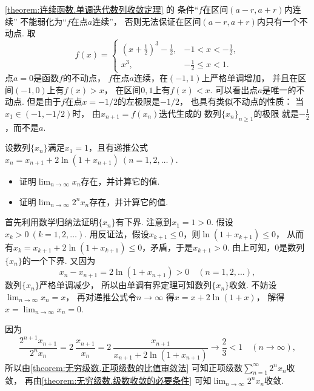 \begin{remark}
\cref{theorem:连续函数.单调迭代数列收敛定理} 的
条件“\(f\)在区间\((a-r,a+r)\)内连续”
不能弱化为“\(f\)在点\(a\)连续”，
否则无法保证在区间\((a-r,a+r)\)内只有一个不动点.
取\[
	f(x) = \left\{ \begin{array}{cc}
		\left( x + \frac12 \right)^3 - \frac12, & -1 < x < -\frac12, \\
		x^3, & -\frac12 \leq x < 1.
	\end{array} \right.
\]
点\(a=0\)是函数\(f\)的不动点，
\(f\)在点\(a\)连续，在\((-1,1)\)上严格单调增加，
并且在区间\((-1,0)\)上有\(f(x)>x\)，
在区间\(0,1\)上有\(f(x)<x\).
可以看出点\(a\)是唯一的不动点.
但是由于\(f\)在点\(x=-1/2\)的左极限是\(-1/2\)，
也具有类似不动点的性质：
当\(x_1 \in (-1,-1/2)\)时，
由\(x_{n+1} = f(x_n)\)迭代生成的
数列\(\{x_n\}_{n\geq1}\)的极限
就是\(-\frac12\)，而不是\(a\).
\end{remark}

\begin{example}
设数列\(\{x_n\}\)满足\(x_1=1\)，且有递推公式\(x_n=x_{n+1}+2\ln(1+x_{n+1})\ (n=1,2,\dotsc)\).
\begin{itemize}
	\item 证明\(\lim_{n\to\infty} x_n\)存在，并计算它的值.
	\item 证明\(\lim_{n\to\infty} 2^n x_n\)存在，并计算它的值.
\end{itemize}
\begin{solution}
首先利用数学归纳法证明\(\{x_n\}\)有下界.
注意到\(x_1=1>0\).
假设\(x_k>0\ (k=1,2,\dotsc)\).
用反证法，假设\(x_{k+1}\leq0\)，则\(\ln(1+x_{k+1})\leq0\)，
从而有\(x_k=x_{k+1}+2\ln(1+x_{k+1})\leq0\)，矛盾，于是\(x_{k+1}>0\).
由上可知，\(0\)是数列\(\{x_n\}\)的一个下界.
又因为\[
	x_n-x_{n+1}=2\ln(1+x_{n+1})>0
	\quad(n=1,2,\dotsc),
\]
数列\(\{x_n\}\)严格单调减少，
所以由单调有界定理可知数列\(\{x_n\}\)收敛.
不妨设\(\lim_{n\to\infty} x_n = x\)，
再对递推公式令\(n\to\infty\)
得\(x=x+2\ln(1+x)\)，
解得\(x = \lim_{n\to\infty} x_n = 0\).

因为\[
	\frac{2^{n+1} x_{n+1}}{2^n x_n}
	= 2~\frac{x_{n+1}}{x_n} %
	= 2~\frac{x_{n+1}}{x_{n+1}+2\ln(1+x_{n+1})} %
	\to \frac23 < 1
	\quad(n\to\infty),
\]
所以由\cref{theorem:无穷级数.正项级数的比值审敛法}
可知正项级数\(\sum_{n=1}^\infty 2^n x_n\)收敛，
再由\cref{theorem:无穷级数.级数收敛的必要条件}
可知\(\lim_{n\to\infty} 2^n x_n\)收敛.
\end{solution}
\end{example}

